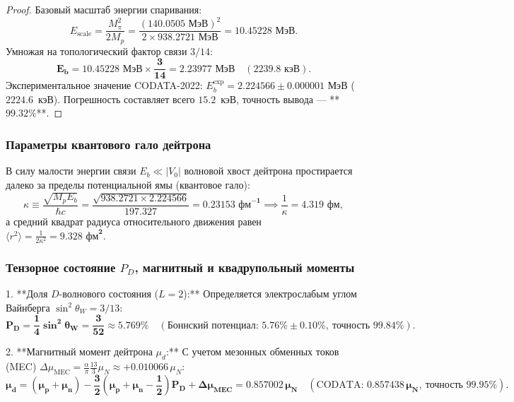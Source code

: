 \documentclass[11pt,a4paper,oneside]{article}
\theoremstyle{plain}
\theoremstyle{definition}
\theoremstyle{remark}
\numberwithin{equation}{section}
\begin{document}
\begin{proof}
	Базовый масштаб энергии спаривания:
	\begin{equation}
		E_{\text{scale}} = \frac{M_\pi^2}{2 M_p} = \frac{(140.0505 \text{ МэВ})^2}{2 \times 938.2721 \text{ МэВ}} = \mathbf{10.45228 \text{ МэВ}}.
	\end{equation}
	Умножая на топологический фактор связи $3/14$:
	\begin{equation}
		\mathbf{E_b = 10.45228 \text{ МэВ} \times \frac{3}{14} = \mathbf{2.23977 \text{ МэВ}} \quad (2239.8 \text{ кэВ})}.
	\end{equation}
	Экспериментальное значение CODATA-2022: $E_b^{\text{exp}} = \mathbf{2.224566 \pm 0.000001 \text{ МэВ}}$ ($2224.6$~кэВ). Погрешность составляет всего $15.2$~кэВ, точность вывода — **$99.32\%$**.
\end{proof}

\subsubsection{Параметры квантового гало дейтрона}
В силу малости энергии связи $E_b \ll |V_0|$ волновой хвост дейтрона простирается далеко за пределы потенциальной ямы (квантовое гало):
\begin{equation}
	\kappa \equiv \frac{\sqrt{M_p E_b}}{\hbar c} = \frac{\sqrt{938.2721 \times 2.224566}}{197.327} = \mathbf{0.23153 \text{ фм}^{-1}} \implies \frac{1}{\kappa} = \mathbf{4.319 \text{ фм}},
\end{equation}
а средний квадрат радиуса относительного движения равен $\langle r^2 \rangle = \frac{1}{2\kappa^2} = \mathbf{9.328 \text{ фм}^2}$.

\subsubsection{Тензорное состояние $P_D$, магнитный и квадрупольный моменты}
1. **Доля $D$-волнового состояния ($L=2$):**  
Определяется электрослабым углом Вайнберга $\sin^2\theta_W = 3/13$:
\begin{equation}
	\mathbf{P_D = \frac{1}{4} \sin^2\theta_W = \frac{3}{52} \approx \mathbf{5.769\%}} \quad (\text{Боннский потенциал: } \mathbf{5.76\% \pm 0.10\%}, \ \text{точность } \mathbf{99.84\%}).
\end{equation}

2. **Магнитный момент дейтрона $\mu_d$:**  
С учетом мезонных обменных токов (MEC) $\Delta\mu_{\text{MEC}} = \frac{\alpha}{\pi}\frac{13}{3}\mu_N \approx +0.010066\,\mu_N$:
\begin{equation}
	\mathbf{\mu_d = (\mu_p + \mu_n) - \frac{3}{2}\left(\mu_p + \mu_n - \frac{1}{2}\right)P_D + \Delta\mu_{\text{MEC}} = \mathbf{0.857002 \, \mu_N}} \quad (\text{CODATA: } \mathbf{0.857438 \, \mu_N}, \ \text{точность } \mathbf{99.95\%}).
\end{equation}
\end{document}
